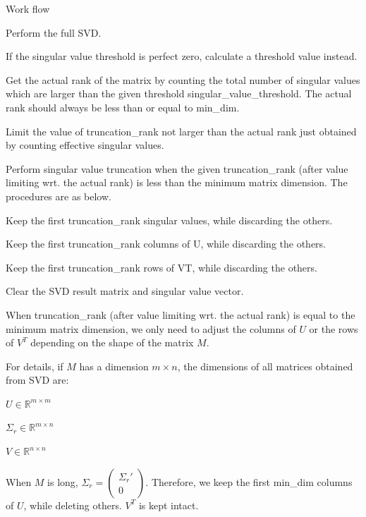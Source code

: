 \begin{DoxyDescription}
\item[Work flow ]

Perform the full S\+VD.

If the singular value threshold is perfect zero, calculate a threshold value instead.

Get the actual rank of the matrix by counting the total number of singular values which are larger than the given threshold {\ttfamily singular\+\_\+value\+\_\+threshold}. The actual rank should always be less than or equal to {\ttfamily min\+\_\+dim}.

Limit the value of {\ttfamily truncation\+\_\+rank} not larger than the actual rank just obtained by counting effective singular values.

Perform singular value truncation when the given {\ttfamily truncation\+\_\+rank} (after value limiting wrt. the actual rank) is less than the minimum matrix dimension. The procedures are as below.


\begin{DoxyEnumerate}
\item Keep the first {\ttfamily truncation\+\_\+rank} singular values, while discarding the others.
\item Keep the first {\ttfamily truncation\+\_\+rank} columns of {\ttfamily U}, while discarding the others.
\item Keep the first {\ttfamily truncation\+\_\+rank} rows of {\ttfamily VT}, while discarding the others.
\end{DoxyEnumerate}

Clear the S\+VD result matrix and singular value vector.

When {\ttfamily truncation\+\_\+rank} (after value limiting wrt. the actual rank) is equal to the minimum matrix dimension, we only need to adjust the columns of $U$ or the rows of $V^T$ depending on the shape of the matrix $M$.

For details, if $M$ has a dimension $m \times n$, the dimensions of all matrices obtained from S\+VD are\+:
\begin{DoxyItemize}
\item $U \in \mathbb{R}^{m \times m}$
\item $\Sigma_r \in \mathbb{R}^{m \times n}$
\item $V \in \mathbb{R}^{n \times n}$
\end{DoxyItemize}

When $M$ is long, $\Sigma_r = \begin{pmatrix}\Sigma_r' \\ 0 \end{pmatrix}$. Therefore, we keep the first {\ttfamily min\+\_\+dim} columns of $U$, while deleting others. $V^T$ is kept intact.


\end{DoxyDescription}
